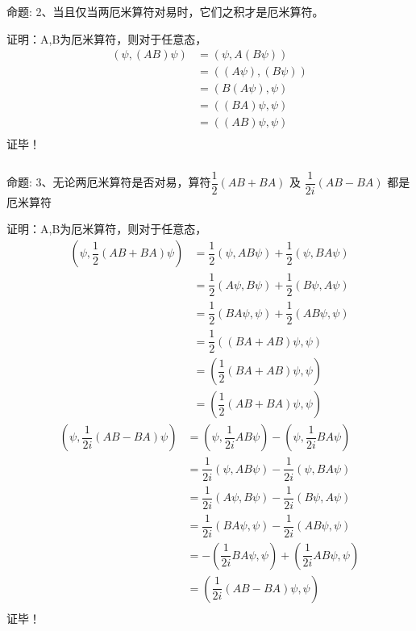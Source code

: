 \begin{frame} [allowframebreaks=]
    \frametitle{}
    \begin{tcolorbox1}{命题:}
        2、当且仅当两厄米算符对易时，它们之积才是厄米算符。
    \end{tcolorbox1}
    \alert{证明：}A,B为厄米算符，则对于任意态，
    \begin{equation*}
        \begin{split}
            (\psi, (AB)\psi ) &= (\psi, A(B\psi) ) \\  
            &=((A \psi), (B\psi) )  \\
            &=(B(A \psi), \psi )  \\
            &=( (BA) \psi, \psi )  \\
            &=( (AB) \psi, \psi )  \\
         \end{split}
    \end{equation*}  
    证毕！
\end{frame}  

\begin{frame} [allowframebreaks=]
    \frametitle{}
    \begin{tcolorbox1}{命题:}
        3、无论两厄米算符是否对易，算符$\dfrac{1}{2}(AB+BA)$ 及 $\dfrac{1}{2i}(AB-BA) $ 都是厄米算符
    \end{tcolorbox1}
    \alert{证明：}A,B为厄米算符，则对于任意态，
    \begin{equation*}
        \begin{split}
            (\psi, \dfrac{1}{2}(AB+BA)\psi ) &=\dfrac{1}{2}(\psi, AB\psi) + \dfrac{1}{2}(\psi, BA\psi)  \\
            &=\dfrac{1}{2}(A\psi, B\psi) + \dfrac{1}{2}(B\psi, A\psi)  \\
            &=\dfrac{1}{2}(BA\psi, \psi) + \dfrac{1}{2}(AB\psi, \psi)  \\
            &=\dfrac{1}{2}((BA+AB)\psi, \psi) \\
            &=(\dfrac{1}{2}(BA+AB)\psi, \psi) \\
            &=(\dfrac{1}{2}(AB+BA)\psi, \psi) 
         \end{split}
    \end{equation*}  
    \begin{equation*}
        \begin{split}
            (\psi, \dfrac{1}{2i}(AB-BA)\psi ) &= (\psi, \dfrac{1}{2i}AB\psi) - (\psi, \dfrac{1}{2i}BA\psi)\\  
            &=\dfrac{1}{2i}(\psi, AB\psi) - \dfrac{1}{2i}(\psi, BA\psi)  \\
            &=\dfrac{1}{2i}(A\psi, B\psi) - \dfrac{1}{2i}(B\psi, A\psi)  \\
            &=\dfrac{1}{2i}(BA\psi, \psi) - \dfrac{1}{2i}(AB\psi, \psi)  \\
            &=-(\dfrac{1}{2i}BA\psi, \psi) +(\dfrac{1}{2i}AB\psi, \psi)  \\
            &=(\dfrac{1}{2i}(AB-BA)\psi, \psi) \\
         \end{split}
    \end{equation*}  
    证毕！
\end{frame}  

